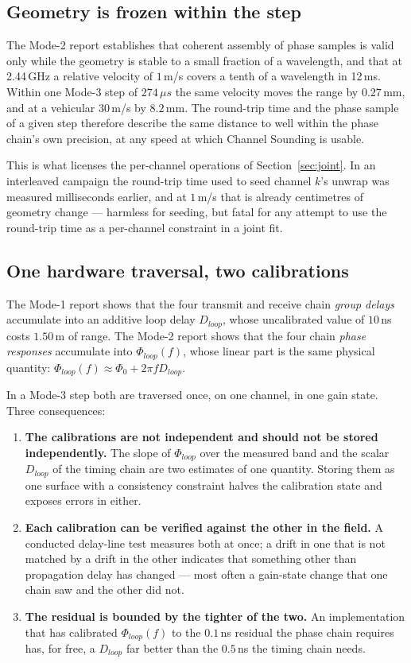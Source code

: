 \documentclass[11pt,a4paper]{article}
\newcommand{\us}{\,\ensuremath{\upmu}s}
\providecommand{\upmu}{\mu}
\begin{document}
\subsection{Geometry is frozen within the step}

The Mode-2 report establishes that coherent assembly of phase samples is valid only while the
geometry is stable to a small fraction of a wavelength, and that at 2.44\,GHz a relative velocity of
$1$\,m/s covers a tenth of a wavelength in 12\,ms. Within one Mode-3 step of $274\us$ the same
velocity moves the range by $0.27$\,mm, and at a vehicular $30$\,m/s by $8.2$\,mm. The round-trip
time and the phase sample of a given step therefore describe the same distance to well within the
phase chain's own precision, at any speed at which Channel Sounding is usable.

This is what licenses the per-channel operations of Section~\ref{sec:joint}. In an interleaved
campaign the round-trip time used to seed channel $k$'s unwrap was measured milliseconds earlier, and
at $1$\,m/s that is already centimetres of geometry change --- harmless for seeding, but fatal for
any attempt to use the round-trip time as a per-channel constraint in a joint fit.

\subsection{One hardware traversal, two calibrations}

The Mode-1 report shows that the four transmit and receive chain \emph{group delays} accumulate into
an additive loop delay $D_{loop}$, whose uncalibrated value of $10$\,ns costs $1.50$\,m of range. The
Mode-2 report shows that the four chain \emph{phase responses} accumulate into $\Phi_{loop}(f)$,
whose linear part is the same physical quantity: $\Phi_{loop}(f)\approx\Phi_0+2\pi f D_{loop}$.

In a Mode-3 step both are traversed once, on one channel, in one gain state. Three consequences:

\begin{enumerate}[leftmargin=1.6em,itemsep=1pt]
  \item \textbf{The calibrations are not independent and should not be stored independently.} The
    slope of $\Phi_{loop}$ over the measured band and the scalar $D_{loop}$ of the timing chain are
    two estimates of one quantity. Storing them as one surface with a consistency constraint halves
    the calibration state and exposes errors in either.
  \item \textbf{Each calibration can be verified against the other in the field.} A conducted
    delay-line test measures both at once; a drift in one that is not matched by a drift in the other
    indicates that something other than propagation delay has changed --- most often a gain-state
    change that one chain saw and the other did not.
  \item \textbf{The residual is bounded by the tighter of the two.} An implementation that has
    calibrated $\Phi_{loop}(f)$ to the $0.1$\,ns residual the phase chain requires has, for free, a
    $D_{loop}$ far better than the $0.5$\,ns the timing chain needs.
\end{enumerate}
\end{document}
